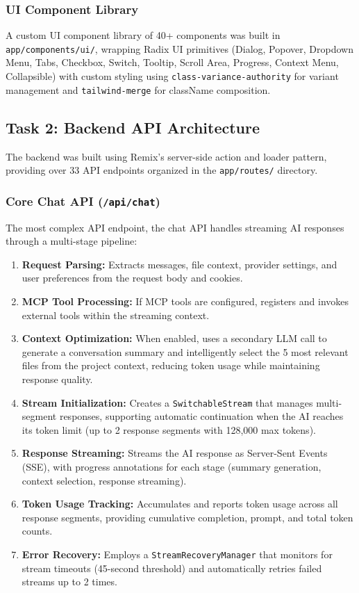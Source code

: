\documentclass[12pt,a4paper,openany]{report}
\begin{document}
\subsubsection{UI Component Library}
A custom UI component library of 40+ components was built in \texttt{app/components/ui/}, wrapping Radix UI primitives (Dialog, Popover, Dropdown Menu, Tabs, Checkbox, Switch, Tooltip, Scroll Area, Progress, Context Menu, Collapsible) with custom styling using \texttt{class-variance-authority} for variant management and \texttt{tailwind-merge} for className composition.

\subsection{Task 2: Backend API Architecture}

The backend was built using Remix's server-side action and loader pattern, providing over 33 API endpoints organized in the \texttt{app/routes/} directory.

\subsubsection{Core Chat API (\texttt{/api/chat})}
The most complex API endpoint, the chat API handles streaming AI responses through a multi-stage pipeline:

\begin{enumerate}
    \item \textbf{Request Parsing:} Extracts messages, file context, provider settings, and user preferences from the request body and cookies.
    \item \textbf{MCP Tool Processing:} If MCP tools are configured, registers and invokes external tools within the streaming context.
    \item \textbf{Context Optimization:} When enabled, uses a secondary LLM call to generate a conversation summary and intelligently select the 5 most relevant files from the project context, reducing token usage while maintaining response quality.
    \item \textbf{Stream Initialization:} Creates a \texttt{SwitchableStream} that manages multi-segment responses, supporting automatic continuation when the AI reaches its token limit (up to 2 response segments with 128,000 max tokens).
    \item \textbf{Response Streaming:} Streams the AI response as Server-Sent Events (SSE), with progress annotations for each stage (summary generation, context selection, response streaming).
    \item \textbf{Token Usage Tracking:} Accumulates and reports token usage across all response segments, providing cumulative completion, prompt, and total token counts.
    \item \textbf{Error Recovery:} Employs a \texttt{StreamRecoveryManager} that monitors for stream timeouts (45-second threshold) and automatically retries failed streams up to 2 times.
\end{enumerate}
\end{document}
